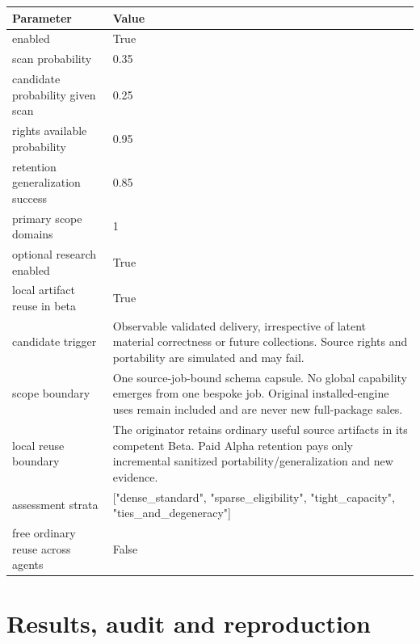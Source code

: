 \documentclass[10pt]{article}
\begin{document}
\begin{longtable}{p{.44\linewidth}p{.50\linewidth}}\toprule Parameter & Value \\\midrule\endhead

enabled & True\\

scan probability & 0.35\\

candidate probability given scan & 0.25\\

rights available probability & 0.95\\

retention generalization success & 0.85\\

primary scope domains & 1\\

optional research enabled & True\\

local artifact reuse in beta & True\\

candidate trigger & Observable validated delivery, irrespective of latent material correctness or future collections. Source rights and portability are simulated and may fail.\\

scope boundary & One source-job-bound schema capsule. No global capability emerges from one bespoke job. Original installed-engine uses remain included and are never new full-package sales.\\

local reuse boundary & The originator retains ordinary useful source artifacts in its competent Beta. Paid Alpha retention pays only incremental sanitized portability/generalization and new evidence.\\

assessment strata & ["dense\_\allowbreak{}standard", "sparse\_\allowbreak{}eligibility", "tight\_\allowbreak{}capacity", "ties\_\allowbreak{}and\_\allowbreak{}degeneracy"]\\

free ordinary reuse across agents & False\\

\bottomrule\end{longtable}

\section{Results, audit and reproduction}














\end{document}
